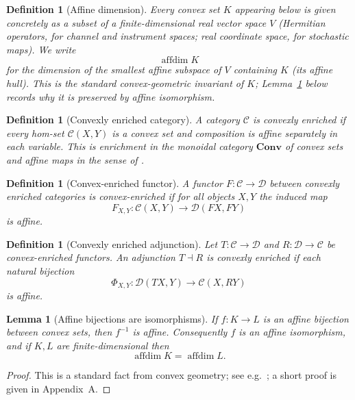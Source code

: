 \documentclass[11pt]{article}
\newtheorem{lemma}[theorem]{Lemma}
\newtheorem{definition}[theorem]{Definition}
\DeclareMathOperator{\affdim}{affdim}
\begin{document}
\begin{definition}[Affine dimension]
Every convex set $K$ appearing below is given concretely as a subset of a
finite-dimensional real vector space $V$ (Hermitian operators, for channel and
instrument spaces; real coordinate space, for stochastic maps). We write
\[
\affdim K
\]
for the dimension of the smallest affine subspace of $V$ containing $K$ (its
affine hull). This is the standard convex-geometric invariant of $K$;
Lemma~\ref{lem:affine-bijection} below records why it is preserved by affine
isomorphism.
\end{definition}

\begin{definition}[Convexly enriched category]
A category $\mathcal C$ is \emph{convexly enriched} if every hom-set
$\mathcal C(X,Y)$ is a convex set and composition is affine separately in each
variable. This is enrichment in the monoidal category $\mathbf{Conv}$ of convex
sets and affine maps in the sense of \cite{Kelly2005}.
\end{definition}

\begin{definition}[Convex-enriched functor]
A functor $F:\mathcal C\to\mathcal D$ between convexly enriched categories is
\emph{convex-enriched} if for all objects $X,Y$ the induced map
\[
F_{X,Y}:\mathcal C(X,Y)\longrightarrow \mathcal D(FX,FY)
\]
is affine.
\end{definition}

\begin{definition}[Convexly enriched adjunction]
Let $T:\mathcal C\to\mathcal D$ and $R:\mathcal D\to\mathcal C$ be
convex-enriched functors. An adjunction $T\dashv R$ is \emph{convexly
enriched} if each natural bijection
\[
\Phi_{X,Y}:\mathcal D(TX,Y)\longrightarrow \mathcal C(X,RY)
\]
is affine.
\end{definition}

\begin{lemma}[Affine bijections are isomorphisms]
\label{lem:affine-bijection}
If $f:K\to L$ is an affine bijection between convex sets, then $f^{-1}$ is
affine. Consequently $f$ is an affine isomorphism, and if $K,L$ are
finite-dimensional then
\[
\affdim K=\affdim L.
\]
\end{lemma}

\begin{proof}
This is a standard fact from convex geometry; see e.g.\
\cite[Cor.~6.6.2]{Rockafellar1970}; a short proof is given in Appendix~A.
\end{proof}
\end{document}
